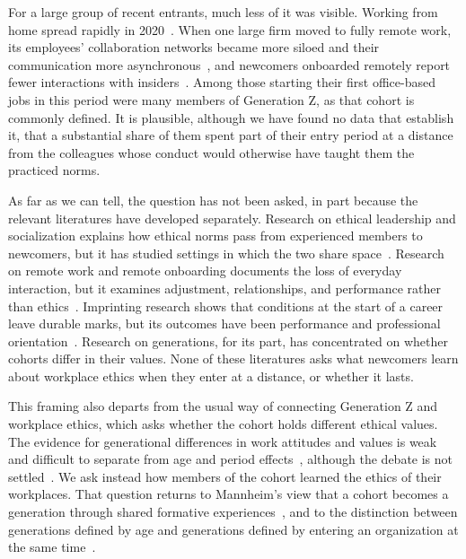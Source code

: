 \documentclass[12pt,a4paper]{article}
\theoremstyle{definition}
\begin{document}
For a large group of recent entrants, much less of it was visible. Working from home spread rapidly in 2020~\citep{kniffin2021covid}. When one large firm moved to fully remote work, its employees' collaboration networks became more siloed and their communication more asynchronous~\citep{yang2022effects}, and newcomers onboarded remotely report fewer interactions with insiders~\citep{paik2026membership}. Among those starting their first office-based jobs in this period were many members of Generation Z, as that cohort is commonly defined. It is plausible, although we have found no data that establish it, that a substantial share of them spent part of their entry period at a distance from the colleagues whose conduct would otherwise have taught them the practiced norms.

As far as we can tell, the question has not been asked, in part because the relevant literatures have developed separately. Research on ethical leadership and socialization explains how ethical norms pass from experienced members to newcomers, but it has studied settings in which the two share space~\citep{brown2005ethical}. Research on remote work and remote onboarding documents the loss of everyday interaction, but it examines adjustment, relationships, and performance rather than ethics~\citep{paik2026membership}. Imprinting research shows that conditions at the start of a career leave durable marks, but its outcomes have been performance and professional orientation~\citep{tilcsik2014imprint}. Research on generations, for its part, has concentrated on whether cohorts differ in their values. None of these literatures asks what newcomers learn about workplace ethics when they enter at a distance, or whether it lasts.

This framing also departs from the usual way of connecting Generation Z and workplace ethics, which asks whether the cohort holds different ethical values. The evidence for generational differences in work attitudes and values is weak and difficult to separate from age and period effects~\citep{costanza2012generational,rudolph2021generations}, although the debate is not settled~\citep{campbell2015generational}. We ask instead how members of the cohort learned the ethics of their workplaces. That question returns to Mannheim's view that a cohort becomes a generation through shared formative experiences~\citep{mannheim1952problem}, and to the distinction between generations defined by age and generations defined by entering an organization at the same time~\citep{joshi2010unpacking}.
\end{document}
